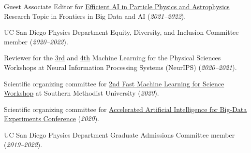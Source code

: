 \documentclass{res}
\begin{document}
\begin{resume}
  Guest Associate Editor for \href{https://www.frontiersin.org/research-topics/19095/efficient-ai-in-particle-physics-and-astrophysics}{Efficient AI in Particle Physics and Astrophysics} Research Topic in Frontiers in Big Data and AI (\textit{2021--2022}).

  UC San Diego Physics Department Equity, Diversity, and Inclusion Committee member (\textit{2020--2022}).

  Reviewer for the \href{https://ml4physicalsciences.github.io/2020/}{3rd} and \href{https://ml4physicalsciences.github.io/2021/}{4th} Machine Learning for the Physical Sciences Workshops at Neural Information Processing Systems (NeurIPS) (\textit{2020--2021}).

  Scientific organizing committee for \href{https://indico.cern.ch/e/fml2020}{2nd Fast Machine Learning for Science Workshop} at Southern Methodist University (\textit{2020}).

  Scientific organizing committee for \href{http://www.ncsa.illinois.edu/Conferences/AcceleratedAINCSA/}{Accelerated Artificial Intelligence for Big-Data Experiments Conference} (\textit{2020}).

  UC San Diego Physics Department Graduate Admissions Committee member (\textit{2019--2022}).

\end{resume}
\end{document}
